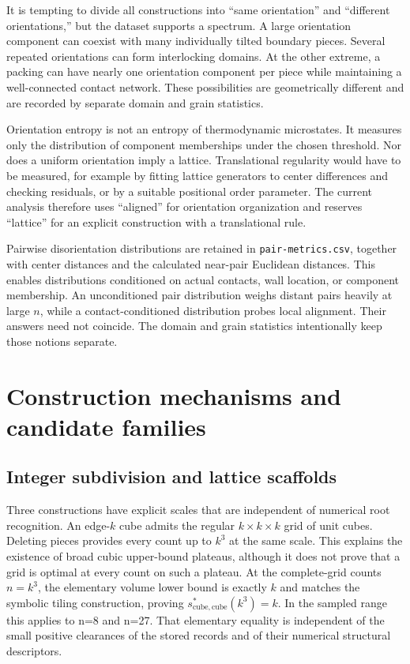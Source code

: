\documentclass[11pt,a4paper]{article}
\begin{document}
It is tempting to divide all constructions into ``same orientation'' and ``different orientations,'' but the dataset supports a spectrum. A large orientation component can coexist with many individually tilted boundary pieces. Several repeated orientations can form interlocking domains. At the other extreme, a packing can have nearly one orientation component per piece while maintaining a well-connected contact network. These possibilities are geometrically different and are recorded by separate domain and grain statistics.

Orientation entropy is not an entropy of thermodynamic microstates. It measures only the distribution of component memberships under the chosen threshold. Nor does a uniform orientation imply a lattice. Translational regularity would have to be measured, for example by fitting lattice generators to center differences and checking residuals, or by a suitable positional order parameter. The current analysis therefore uses ``aligned'' for orientation organization and reserves ``lattice'' for an explicit construction with a translational rule.

Pairwise disorientation distributions are retained in \nolinkurl{pair-metrics.csv}, together with center distances and the calculated near-pair Euclidean distances. This enables distributions conditioned on actual contacts, wall location, or component membership. An unconditioned pair distribution weighs distant pairs heavily at large $n$, while a contact-conditioned distribution probes local alignment. Their answers need not coincide. The domain and grain statistics intentionally keep those notions separate.

\section{Construction mechanisms and candidate families}

\subsection{Integer subdivision and lattice scaffolds}

Three constructions have explicit scales that are independent of numerical root recognition. An edge-$k$ cube admits the regular $k\times k\times k$ grid of unit cubes. Deleting pieces provides every count up to $k^3$ at the same scale. This explains the existence of broad cubic upper-bound plateaus, although it does not prove that a grid is optimal at every count on such a plateau. At the complete-grid counts $n=k^3$, the elementary volume lower bound is exactly $k$ and matches the symbolic tiling construction, proving $s^*_{\mathrm{cube},\mathrm{cube}}(k^3)=k$. In the sampled range this applies to n=8 and n=27. That elementary equality is independent of the small positive clearances of the stored records and of their numerical structural descriptors.
\end{document}
